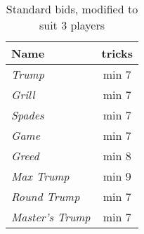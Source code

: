 %
%
%

\begin{table}
	\caption{Standard bids, modified to suit 3 players}\label{tab:standardBids3}
	\begin{center}
		\begin{tabular}{l|c}
			\textbf{Name} & \textbf{tricks}
			\\ \hline
			\textit{Trump} & min 7 \\
			\textit{Grill} & min 7 \\
			\textit{Spades} & min 7 \\
			\textit{Game} & min 7 \\
			\textit{Greed} & min 8 \\
			\textit{Max Trump} & min 9 \\
			\textit{Round Trump} & min 7 \\
			\textit{Master's Trump} & min 7
		\end{tabular}
	\end{center}
\end{table}
